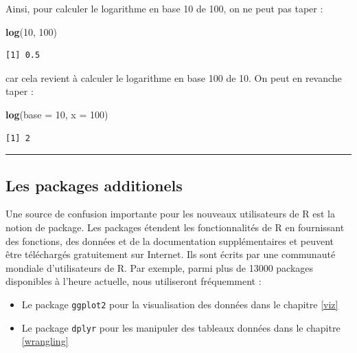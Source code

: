 \documentclass[a4paperpaper,]{article}
\newenvironment{Shaded}{\begin{snugshade}}{\end{snugshade}}
\newcommand{\DataTypeTok}[1]{\textcolor[rgb]{0.00,0.34,0.68}{#1}}
\newcommand{\DecValTok}[1]{\textcolor[rgb]{0.69,0.50,0.00}{#1}}
\newcommand{\KeywordTok}[1]{\textcolor[rgb]{0.12,0.11,0.11}{\textbf{#1}}}
\newcommand{\NormalTok}[1]{\textcolor[rgb]{0.12,0.11,0.11}{#1}}
\providecommand{\tightlist}{%
  \setlength{\itemsep}{0pt}\setlength{\parskip}{0pt}}
\theoremstyle{definition}
\theoremstyle{definition}
\theoremstyle{definition}
\theoremstyle{remark}
\begin{document}
Ainsi, pour calculer le logarithme en base 10 de 100, on ne peut pas
taper :

\begin{Shaded}
\begin{Highlighting}[]
\KeywordTok{log}\NormalTok{(}\DecValTok{10}\NormalTok{, }\DecValTok{100}\NormalTok{)}
\end{Highlighting}
\end{Shaded}

\begin{verbatim}
[1] 0.5
\end{verbatim}

car cela revient à calculer le logarithme en base 100 de 10. On peut en
revanche taper :

\begin{Shaded}
\begin{Highlighting}[]
\KeywordTok{log}\NormalTok{(}\DataTypeTok{base =} \DecValTok{10}\NormalTok{, }\DataTypeTok{x =} \DecValTok{100}\NormalTok{)}
\end{Highlighting}
\end{Shaded}

\begin{verbatim}
[1] 2
\end{verbatim}

\begin{center}\rule{0.5\linewidth}{\linethickness}\end{center}

\hypertarget{packages}{%
\subsection{Les packages additionels}\label{packages}}

Une source de confusion importante pour les nouveaux utilisateurs de R
est la notion de package. Les packages étendent les fonctionnalités de R
en fournissant des fonctions, des données et de la documentation
supplémentaires et peuvent être téléchargés gratuitement sur Internet.
Ils sont écrits par une communauté mondiale d'utilisateurs de R. Par
exemple, parmi plus de 13000 packages disponibles à l'heure actuelle,
nous utiliseront fréquemment :

\begin{itemize}
\tightlist
\item
  Le package \texttt{ggplot2} pour la visualisation des données dans le
  chapitre \ref{viz}
\item
  Le package \texttt{dplyr} pour les manipuler des tableaux données dans
  le chapitre \ref{wrangling}
\end{itemize}
\end{document}
